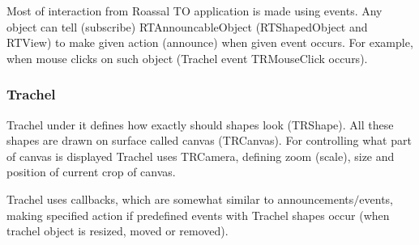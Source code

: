 \documentclass[a4paper,10pt,twoside]{book}
\begin{document}
Most of interaction from Roassal TO application is made using events. Any object can tell (subscribe) RTAnnouncableObject (RTShapedObject and RTView) to make given action (announce) when given event occurs. For example, when mouse clicks on such object (Trachel event TRMouseClick occurs).
\subsubsection{ Trachel}
Trachel under it defines how exactly should shapes look (TRShape). All these shapes are drawn on surface called canvas (TRCanvas). For controlling what part of canvas is displayed Trachel uses TRCamera, defining zoom (scale), size and position of current crop of canvas.

Trachel uses callbacks, which are somewhat similar to announcements$/$events, making specified action if predefined events with Trachel shapes occur (when trachel object is resized, moved or removed).



\ifx\wholebook\relax\else
   
\end{document}
